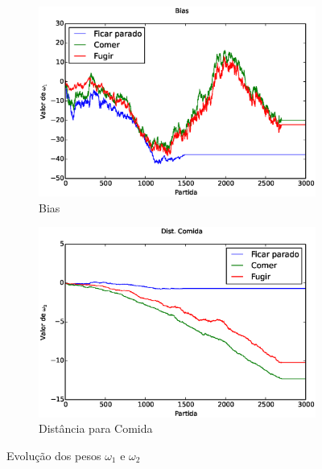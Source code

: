 \begin{figure}[H]
	\centering
	\begin{subfigure}[t]{.5\textwidth}
		\centering
		\includegraphics[width=\linewidth]{images/3_behaviors_small_map/weights____pol__Bias}
		\caption{Bias}
		\label{img:3ComportamentosMapaPequeno:PesoBias}
	\end{subfigure}%
	\begin{subfigure}[t]{.5\textwidth}
		\centering
		\includegraphics[width=\linewidth]{images/3_behaviors_small_map/weights____pol__DistComida}
		\caption{Distância para Comida}
		\label{img:3ComportamentosMapaPequeno:PesoDistComida}
	\end{subfigure}
	\caption{Evolução dos pesos $ \omega_1 $ e $ \omega_2 $}
	\label{img:3ComportamentosMapaPequeno:PesoBiasAndDistComida}
\end{figure}

